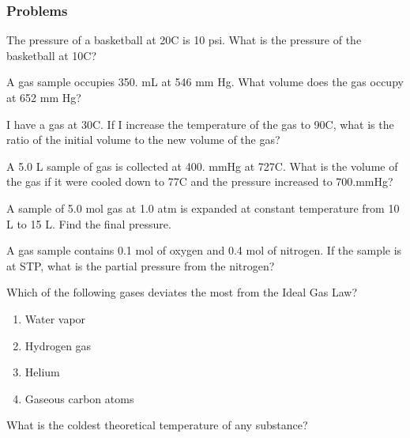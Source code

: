 \subsubsection{Problems}
\begin{problem}
The pressure of a basketball at 20\degree C is 10 psi. What is the pressure of the basketball at 10\degree C?
\end{problem}

\begin{problem}
A gas sample occupies 350. mL at 546 mm Hg. What volume does the gas occupy at 652 mm Hg?
\end{problem}

\begin{problem}
I have a gas at 30\degree C. If I increase the temperature of the gas to 90\degree C, what is the ratio of the initial volume to the new volume of the gas?
\end{problem}

\begin{problem}
A 5.0 L sample of gas is collected at 400. mmHg at 727\degree C. What is the volume of the gas if it were cooled down to 77\degree C and the pressure increased to 700.mmHg?
\end{problem}

\begin{problem}
A sample of 5.0 mol gas at 1.0 atm is expanded at constant temperature from 10 L to 15 L. Find the final pressure.
\end{problem}

\begin{problem}
A gas sample contains 0.1 mol of oxygen and 0.4 mol of nitrogen. If the sample is at STP, what is the partial pressure from the nitrogen?
\end{problem}

\begin{problem}
Which of the following gases deviates the most from the Ideal Gas Law?
\begin{enumerate}[label=(\alph*)]
\item Water vapor
\item Hydrogen gas
\item Helium 
\item Gaseous carbon atoms
\end{enumerate}
\end{problem}

\begin{problem}
What is the coldest theoretical temperature of any substance?
\end{problem}

